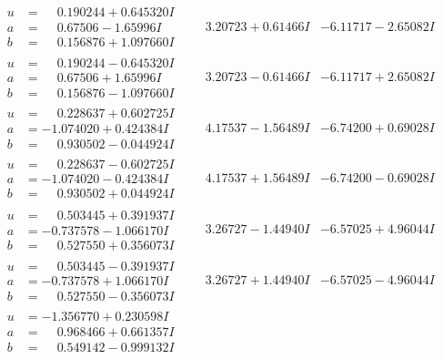 \documentclass[1p]{elsarticle_modified}
\theoremstyle{definition}
\begin{document}
$$\begin{array}{c|c|c}
\begin{aligned}
u &= \phantom{-}0.190244 + 0.645320 I \\
a &= \phantom{-}0.67506 - 1.65996 I \\
b &= \phantom{-}0.156876 + 1.097660 I\end{aligned}
 & \phantom{-}3.20723 + 0.61466 I & -6.11717 - 2.65082 I \\ \hline\begin{aligned}
u &= \phantom{-}0.190244 - 0.645320 I \\
a &= \phantom{-}0.67506 + 1.65996 I \\
b &= \phantom{-}0.156876 - 1.097660 I\end{aligned}
 & \phantom{-}3.20723 - 0.61466 I & -6.11717 + 2.65082 I \\ \hline\begin{aligned}
u &= \phantom{-}0.228637 + 0.602725 I \\
a &= -1.074020 + 0.424384 I \\
b &= \phantom{-}0.930502 - 0.044924 I\end{aligned}
 & \phantom{-}4.17537 - 1.56489 I & -6.74200 + 0.69028 I \\ \hline\begin{aligned}
u &= \phantom{-}0.228637 - 0.602725 I \\
a &= -1.074020 - 0.424384 I \\
b &= \phantom{-}0.930502 + 0.044924 I\end{aligned}
 & \phantom{-}4.17537 + 1.56489 I & -6.74200 - 0.69028 I \\ \hline\begin{aligned}
u &= \phantom{-}0.503445 + 0.391937 I \\
a &= -0.737578 - 1.066170 I \\
b &= \phantom{-}0.527550 + 0.356073 I\end{aligned}
 & \phantom{-}3.26727 - 1.44940 I & -6.57025 + 4.96044 I \\ \hline\begin{aligned}
u &= \phantom{-}0.503445 - 0.391937 I \\
a &= -0.737578 + 1.066170 I \\
b &= \phantom{-}0.527550 - 0.356073 I\end{aligned}
 & \phantom{-}3.26727 + 1.44940 I & -6.57025 - 4.96044 I \\ \hline\begin{aligned}
u &= -1.356770 + 0.230598 I \\
a &= \phantom{-}0.968466 + 0.661357 I \\
b &= \phantom{-}0.549142 - 0.999132 I\end{aligned}

\end{array}$$
\end{document}
